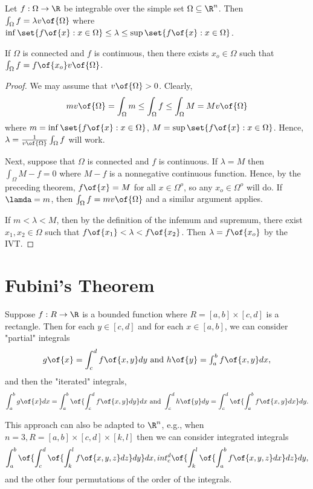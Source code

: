 \begin{theorem}
	Let $f: \Omega \to \R$ be integrable over the simple set $\Omega \subseteq \R^n$. Then $\int_\Omega f = \lambda v\of{\Omega}$ where $\inf\set{f\of{x}: x \in \Omega} \leq \lambda \leq \sup\set{f\of{x}: x \in \Omega}$.

	If $\Omega$ is connected and $f$ is continuous, then there exists $x_o \in \Omega$ such that $\int_\Omega f = f\of{x_o} v\of{\Omega}$.
\end{theorem}
\begin{proof}
	We may assume that $v\of{\Omega} > 0$. Clearly, \[m v\of{\Omega} = \int_\Omega m \leq \int_\Omega f \leq \int_\Omega M = M v\of{\Omega}\] where $m = \inf\set{f\of{x}: x \in \Omega}$, $M = \sup\set{f\of{x}: x \in \Omega}$. Hence, $\lambda = \frac{1}{v\of{\Omega}} \int_\Omega f$ will work.

	Next, suppose that $\Omega$ is connected and $f$ is continuous. If $\lambda = M$ then $\int_\Omega M - f = 0$ where $M - f$ is a nonnegative continuous function. Hence, by the preceding theorem, $f\of{x} = M$ for all $x \in \Omega^o$, so any $x_o \in \Omega^o$ will do. If $\lamda = m$, then $\int_\Omega f = m v\of{\Omega}$ and a similar argument applies.

	If $m < \lambda < M$, then by the definition of the infemum and supremum, there exist $x_1, x_2 \in \Omega$ such that $f\of{x_1} < \lambda < f\of{x_2}$. Then $\lambda = f\of{x_o}$ by the IVT.
\end{proof}

\section{Fubini's Theorem}

Suppose $f: R \to \R$ is a bounded function where $R = [a,b] \times [c,d]$ is a rectangle. Then for each $y \in [c,d]$ and for each $x \in [a,b]$, we can consider "partial" integrals \[g\of{x} = \int_c^d f\of{x,y} dy$ and $h\of{y} = \int_a^b f\of{x,y} dx,\] and then the "iterated" integrals, \[\int_a^b g\of{x} dx = \int_a^b \of{ \int_c^d f\of{x,y} dy} dx \text{ and } \int_c^d h\of{y} dy = \int_c^d \of{\int_a^b f\of{x,y} dx} dy.\]

This approach can also be adapted to $\R^n$, e.g., when $n = 3, R = [a,b] \times [c,d] \times [k,l]$ then we can consider integrated integrals \[\int_a^b \of{ \int_c^d \of{ \int_k^l f\of{x,y,z} dz} dy} dx, int_c^d \of{ \int_k^l \of {\int_a^b f\of{x,y,z} dx} dz} dy,\] and the other four permutations of the order of the integrals.

